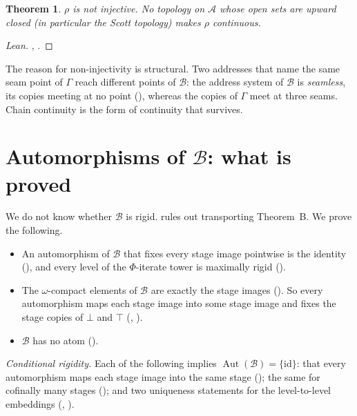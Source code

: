 \documentclass[11pt]{amsart}
\theoremstyle{plain}
\newtheorem{theorem}{Theorem}[section]
\theoremstyle{definition}
\newcommand{\Aut}{\operatorname{Aut}}
\newcommand{\BB}{\mathcal{B}}
\newcommand{\GG}{\Gamma}
\newcommand{\id}{\mathrm{id}}
\begin{document}
\begin{theorem}\label{thm:rhoneg}
$\rho$ is not injective. No topology on $\mathcal A$ whose open sets are upward
closed (in particular the Scott topology) makes $\rho$ continuous.
\end{theorem}
\begin{proof}[Lean]
,
.
\end{proof}

The reason for non-injectivity is structural. Two addresses that name the same
seam point of $\GG$ reach different points of $\BB$: the address system of $\BB$
is \emph{seamless}, its copies meeting at no point
(), whereas the copies of $\GG$ meet at three
seams. Chain continuity is the form of continuity that survives.

\section{Automorphisms of \texorpdfstring{$\BB$}{B}: what is proved}\label{sec:Brigid}

We do not know whether $\BB$ is rigid.  rules out transporting
Theorem~B. We prove the following.

\begin{itemize}[leftmargin=2em]
\item An automorphism of $\BB$ that fixes every stage image pointwise is the
  identity (), and every level of the
  $\Phi$-iterate tower is maximally rigid
  ().
\item The $\omega$-compact elements of $\BB$ are exactly the stage images
  (). So every automorphism maps each
  stage image into some stage image and fixes the stage copies of $\bot$ and
  $\top$ (,
  ).
\item $\BB$ has no atom ().
\end{itemize}

\emph{Conditional rigidity.} Each of the following implies $\Aut(\BB)=\{\id\}$:
that every automorphism maps each stage image into the same stage
(); the same for cofinally many
stages (); and two uniqueness statements
for the level-to-level embeddings
(,
).
\end{document}
